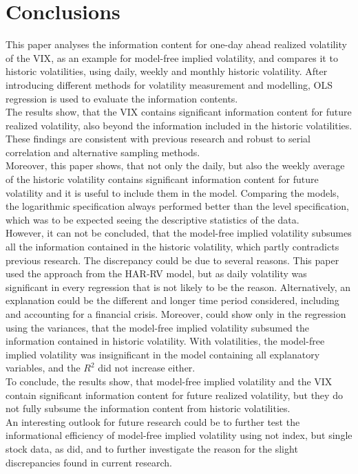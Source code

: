 
\section{Conclusions}
This paper analyses the information content for one-day ahead realized volatility of the \ac{VIX}, as an example for model-free implied volatility, and compares it to historic volatilities, using daily, weekly and monthly historic volatility. After introducing different methods for volatility measurement and modelling, OLS regression is used to evaluate the information contents. \\
The results show, that the \ac{VIX} contains significant information content for future realized volatility, also beyond the information included in the historic volatilities. These findings are consistent with previous research and robust to serial correlation and alternative sampling methods. \\
Moreover, this paper shows, that not only the daily, but also the weekly average of the  historic volatility contains significant information content for future volatility and it is useful to include them in the model. Comparing the models, the logarithmic specification always performed better than the level specification, which was to be expected seeing the descriptive statistics of the data. \\
However, it can not be concluded, that the model-free implied volatility subsumes all the information contained in the historic volatility, which partly contradicts previous research. The discrepancy could be due to several reasons. This paper used the approach from the HAR-RV model, but as daily volatility was significant in every regression that is not likely to be the reason. Alternatively, an explanation could be the different and longer time period considered, including and accounting for a financial crisis. Moreover, \textcite{jiang2003} could show only in the regression using the variances, that the model-free implied volatility subsumed the information contained in historic volatility. With volatilities, the model-free implied volatility was insignificant in the model containing all explanatory variables, and the $R^{2}$ did not increase either.\\
To conclude, the results show, that model-free implied volatility and the VIX contain significant information content for future realized volatility, but they do not fully subsume the information content from historic volatilities.\\
An interesting outlook for future research could be to further test the informational efficiency of model-free implied volatility using not index, but single stock data, as \textcite{taylor2010} did, and to further investigate the reason for the slight discrepancies found in current research.

